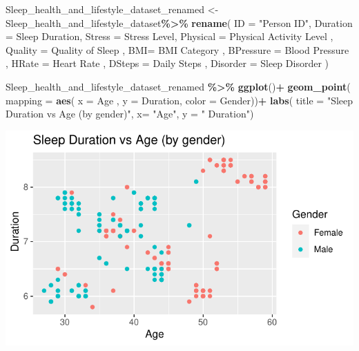 \documentclass[
  11pt,
]{article}
\newenvironment{Shaded}{\begin{snugshade}}{\end{snugshade}}
\newcommand{\AttributeTok}[1]{\textcolor[rgb]{0.13,0.29,0.53}{#1}}
\newcommand{\FunctionTok}[1]{\textcolor[rgb]{0.13,0.29,0.53}{\textbf{#1}}}
\newcommand{\NormalTok}[1]{#1}
\newcommand{\OtherTok}[1]{\textcolor[rgb]{0.56,0.35,0.01}{#1}}
\newcommand{\SpecialCharTok}[1]{\textcolor[rgb]{0.81,0.36,0.00}{\textbf{#1}}}
\newcommand{\StringTok}[1]{\textcolor[rgb]{0.31,0.60,0.02}{#1}}
\begin{document}
\begin{Shaded}
\begin{Highlighting}[]
\NormalTok{Sleep\_health\_and\_lifestyle\_dataset\_renamed }\OtherTok{\textless{}{-}}\NormalTok{ Sleep\_health\_and\_lifestyle\_dataset}\SpecialCharTok{\%\textgreater{}\%}
  \FunctionTok{rename}\NormalTok{( }\AttributeTok{ID =} \StringTok{"Person ID"}\NormalTok{,}
          \AttributeTok{Duration =} \StringTok{\textquotesingle{}Sleep Duration\textquotesingle{}}\NormalTok{,}
          \AttributeTok{Stress =} \StringTok{\textquotesingle{}Stress Level\textquotesingle{}}\NormalTok{,}
          \AttributeTok{Physical =} \StringTok{\textquotesingle{}Physical Activity Level\textquotesingle{}}\NormalTok{ ,}
          \AttributeTok{Quality =} \StringTok{\textquotesingle{}Quality of Sleep\textquotesingle{}}\NormalTok{ ,}
          \AttributeTok{BMI=} \StringTok{\textquotesingle{}BMI Category\textquotesingle{}}\NormalTok{ ,}
          \AttributeTok{BPressure =} \StringTok{\textquotesingle{}Blood Pressure\textquotesingle{}}\NormalTok{ ,}
          \AttributeTok{HRate =} \StringTok{\textquotesingle{}Heart Rate\textquotesingle{}}\NormalTok{ ,}
          \AttributeTok{DSteps =} \StringTok{\textquotesingle{}Daily Steps\textquotesingle{}}\NormalTok{ ,}
          \AttributeTok{Disorder =} \StringTok{\textquotesingle{}Sleep Disorder\textquotesingle{}}\NormalTok{ )}
\end{Highlighting}
\end{Shaded}

\begin{Shaded}
\begin{Highlighting}[]
\NormalTok{Sleep\_health\_and\_lifestyle\_dataset\_renamed }\SpecialCharTok{\%\textgreater{}\%}
  \FunctionTok{ggplot}\NormalTok{()}\SpecialCharTok{+}
  \FunctionTok{geom\_point}\NormalTok{( }\AttributeTok{mapping =} \FunctionTok{aes}\NormalTok{( }\AttributeTok{x =}\NormalTok{ Age , }\AttributeTok{y =}\NormalTok{ Duration, }\AttributeTok{color =}\NormalTok{ Gender))}\SpecialCharTok{+}
  \FunctionTok{labs}\NormalTok{(}
   \AttributeTok{title =} \StringTok{"Sleep Duration vs Age (by gender)"}\NormalTok{,}
   \AttributeTok{x=} \StringTok{"Age"}\NormalTok{, }\AttributeTok{y =} \StringTok{" Duration"}\NormalTok{)}
\end{Highlighting}
\end{Shaded}

\begin{center}\includegraphics[width=0.7\linewidth]{SleepHelath_files/figure-latex/unnamed-chunk-29-1} \end{center}
\end{document}
